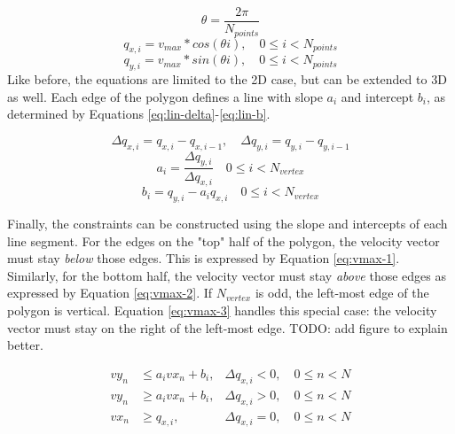 \begin{equation}
\label{eq:maxvel-theta}
\theta = \dfrac{2\pi}{N_{points}}
\end{equation}
\begin{equation}
\label{eq:maxvel-points-x}
q_{x,i}  = v_{max} * cos( \theta i), \quad 0 \leq i < N_{points}
\end{equation}
\begin{equation}
\label{eq:maxvel-points-y}
q_{y,i}  = v_{max} * sin( \theta i), \quad 0 \leq i < N_{points}
\end{equation}
Like before, the equations are limited to the 2D case, but can be extended to 3D as well. Each edge of the polygon defines a line with slope $a_i$ and intercept $b_i$, as determined by Equations \ref{eq:lin-delta}-\ref{eq:lin-b}.

\begin{equation}
\label{eq:lin-delta}
\Delta q_{x,i} = q_{x,i} - q_{x,i-1}, \quad \Delta q_{y,i} = q_{y,i} - q_{y,i-1}
\end{equation}
\begin{equation}
\label{eq:lin-a}
a_i = \dfrac{\Delta q_{y,i}}{\Delta q_{x,i}} \quad 0 \leq i < N_{vertex}
\end{equation}
\begin{equation}
\label{eq:lin-b}
b_i = q_{y,i} - a_i q_{x,i}  \quad 0 \leq i < N_{vertex}
\end{equation}


Finally, the constraints can be constructed using the slope and intercepts of each line segment. For the edges on the "top" half of the polygon, the velocity vector must stay \emph{below} those edges. This is expressed by Equation \ref{eq:vmax-1}. Similarly, for the bottom half, the velocity vector must stay \emph{above} those edges as expressed by Equation \ref{eq:vmax-2}. If $N_{vertex}$ is odd, the left-most edge of the polygon is vertical. Equation \ref{eq:vmax-3} handles this special case: the velocity vector must stay on the right of the left-most edge. TODO: add figure to explain better.

\begin{align}
vy_{n} &\leq a_i vx_{n} + b_i,  & \Delta q_{x,i} < 0, \quad 0 \leq n < N  \label{eq:vmax-1} \\
vy_{n} &\geq a_i vx_{n} + b_i,  & \Delta q_{x,i} > 0, \quad 0 \leq n < N \label{eq:vmax-2} \\
vx_{n} &\geq q_{x,i},  & \Delta q_{x,i} = 0, \quad 0 \leq n < N \label{eq:vmax-3}
\end{align}

